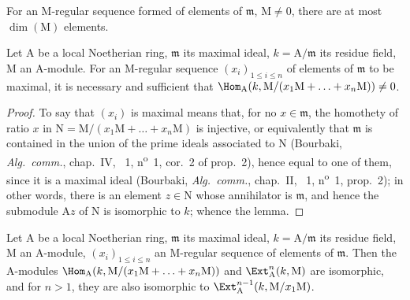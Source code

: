 For an $\mathrm{M}$-regular sequence formed of elements of $\mathfrak{m}$, $\mathrm{M}\neq 0$, there are at most $\dim(\mathrm{M})$ elements.

\begin{lemma}[16.4.2]
\label{0.16.4.2}
Let $\mathrm{A}$ be a local Noetherian ring, $\mathfrak{m}$ its maximal ideal, $k=\mathrm{A}/\mathfrak{m}$ its residue field, $\mathrm{M}$ an $\mathrm{A}$-module.
For an $\mathrm{M}$-regular sequence $(x_i)_{1\leq i\leq n}$ of elements of $\mathfrak{m}$ to be maximal, it is necessary and sufficient that $\Hom_\mathrm{A}(k,\mathrm{M}/(x_1\mathrm{M}+\ldots+x_n\mathrm{M}))\neq 0$.
\end{lemma}

\begin{proof}
To say that $(x_i)$ is maximal means that, for no $x\in\mathfrak{m}$, the homothety of ratio $x$ in $\mathrm{N}=\mathrm{M}/(x_1\mathrm{M}+\ldots+x_n\mathrm{M})$ is injective, or equivalently that $\mathfrak{m}$ is contained in the union of the prime ideals associated to $\mathrm{N}$ (Bourbaki, \emph{Alg.~comm.}, chap.~IV, \textsection~1, n\textsuperscript{o}~1, cor.~2 of prop.~2), hence equal to one of them, since it is a maximal ideal (Bourbaki, \emph{Alg.~comm.}, chap.~II, \textsection~1, n\textsuperscript{o}~1, prop.~2); in other words, there is an element $z\in\mathrm{N}$ whose annihilator is $\mathfrak{m}$, and hence the submodule $\mathrm{A}z$ of $\mathrm{N}$ is isomorphic to $k$; whence the lemma.
\end{proof}

\begin{lemma}[16.4.3]
\label{0.16.4.3}
Let $\mathrm{A}$ be a local Noetherian ring, $\mathfrak{m}$ its maximal ideal, $k=\mathrm{A}/\mathfrak{m}$ its residue field, $\mathrm{M}$ an $\mathrm{A}$-module, $(x_i)_{1\leq i\leq n}$ an $\mathrm{M}$-regular sequence of elements of $\mathfrak{m}$.
Then the $\mathrm{A}$-modules $\Hom_\mathrm{A}(k,\mathrm{M}/(x_1\mathrm{M}+\ldots+x_n\mathrm{M}))$ and $\Ext^n_\mathrm{A}(k,\mathrm{M})$ are isomorphic, and for $n>1$, they are also isomorphic to $\Ext^{n-1}_\mathrm{A}(k,\mathrm{M}/x_1\mathrm{M})$.
\end{lemma}

